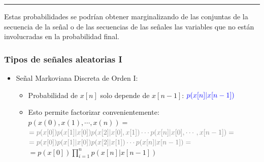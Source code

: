 \documentclass{beamer}
\numberwithin{section}{part}
\begin{document}
\begin{frame}
  \rule{11cm}{0.04ex}
  \scriptsize

  Estas probabilidades se podrían obtener marginalizando de las conjuntas de la secuencia de la señal o de las secuencias de las señales las variables que no están involucradas en la probabilidad final.
\end{frame}




\begin{frame}[fragile]
  \frametitle{Tipos de señales aleatorias I}
  \vspace{-0.2cm}
  \footnotesize
  \begin{itemize}
    \item \alert{Señal Markoviana Discreta de Orden I: }
    \begin{itemize}
      \footnotesize
      \item Probabilidad de $x[n]$ solo depende de $x[n-1]$: $\color{blue}p(x[n]|x[n-1])$
      \vspace{0.1cm}
      \item Esto permite factorizar convenientemente:\\
      {\scriptsize
      \vspace{0.1cm}
      $p(x(0),x(1),\cdots,x(n))=$
      \vspace{0.1cm}
      \hspace{0.3cm}$\color{gray}=p(x[0])p(x[1]|x[0])p(x[2]|x[0],x[1])\cdots p(x[n]|x[0],\cdots,x[n-1])=$
      \vspace{0.1cm}
      \hspace{0.3cm}$\color{gray}=p(x[0])p(x[1]|x[0])p(x[2]|x[1])\cdots p(x[n]|x[n-1])=$
      \vspace{0.1cm}
      \hspace{0.3cm}$=p(x[0])\prod_{i=1}^n p(x[n]|x[n-1])$
      }
    \end{itemize}
  \end{itemize}


\end{frame}
\end{document}

